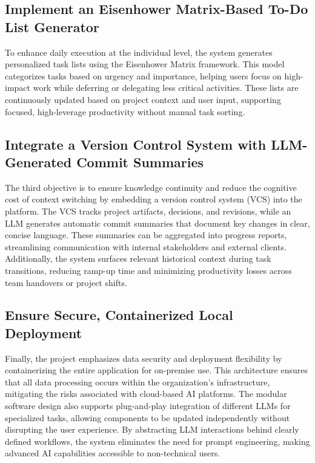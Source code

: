 \documentclass{report}
\begin{document}
\subsection{Implement an Eisenhower Matrix-Based To-Do List Generator}
To enhance daily execution at the individual level, the system generates personalized task lists using the Eisenhower Matrix framework. This model categorizes tasks based on urgency and importance, helping users focus on high-impact work while deferring or delegating less critical activities. These lists are continuously updated based on project context and user input, supporting focused, high-leverage productivity without manual task sorting.
\subsection{Integrate a Version Control System with LLM-Generated Commit Summaries}
The third objective is to ensure knowledge continuity and reduce the cognitive cost of context switching by embedding a version control system (VCS) into the platform. The VCS tracks project artifacts, decisions, and revisions, while an LLM generates automatic commit summaries that document key changes in clear, concise language. These summaries can be aggregated into progress reports, streamlining communication with internal stakeholders and external clients. Additionally, the system surfaces relevant historical context during task transitions, reducing ramp-up time and minimizing productivity losses across team handovers or project shifts.
\subsection{Ensure Secure, Containerized Local Deployment}
Finally, the project emphasizes data security and deployment flexibility by containerizing the entire application for on-premise use. This architecture ensures that all data processing occurs within the organization’s infrastructure, mitigating the risks associated with cloud-based AI platforms. The modular software design also supports plug-and-play integration of different LLMs for specialized tasks, allowing components to be updated independently without disrupting the user experience. By abstracting LLM interactions behind clearly defined workflows, the system eliminates the need for prompt engineering, making advanced AI capabilities accessible to non-technical users.
\end{document}

